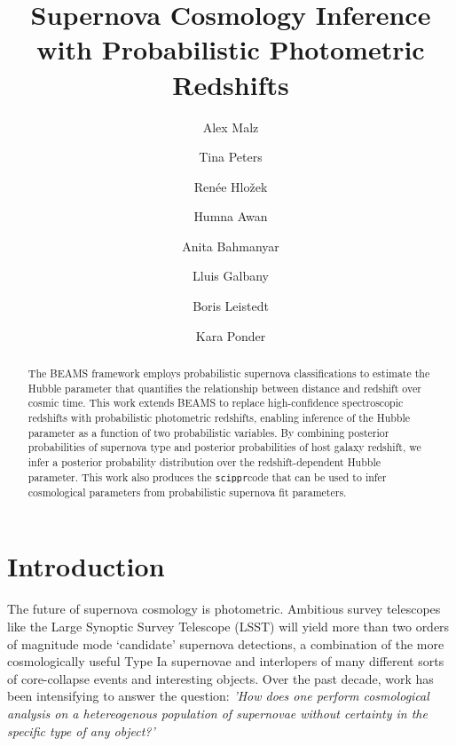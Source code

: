 \documentclass[12pt, onecolumn]{emulateapj}
\newcommand{\scippr}{\texttt{scippr}}
\begin{document}
\newcommand{\tkTP}[1]{\textcolor{red}{#1}}  %
\newcommand{\tkRH}[1]{\textcolor{blue}{#1}}  %
\newcommand{\tkAM}[1]{\textcolor{green}{#1}}  %
\title{Supernova Cosmology Inference with Probabilistic Photometric Redshifts}

\author{Alex Malz}
\author{Tina Peters}
\author{Ren\'ee Hlo\v{z}ek}
\author{Humna Awan}
\author{Anita Bahmanyar}
\author{Lluis Galbany}
\author{Boris Leistedt}
\author{Kara Ponder}

\begin{abstract}
The BEAMS framework employs probabilistic supernova classifications to estimate the Hubble parameter that quantifies the relationship between distance and redshift over cosmic time.  This work extends BEAMS to replace high-confidence spectroscopic redshifts with probabilistic photometric redshifts, enabling inference of the Hubble parameter as a function of two probabilistic variables.  By combining posterior probabilities of supernova type and posterior probabilities of host galaxy redshift, we infer a posterior probability distribution over the redshift-dependent Hubble parameter.  This work also produces the \scippr code that can be used to infer cosmological parameters from probabilistic supernova fit parameters.
\end{abstract}
\keywords{}
\maketitle

\section{Introduction}
\label{sec:intro}
The future of supernova cosmology is photometric. Ambitious survey telescopes like the Large Synoptic Survey Telescope (LSST) will yield more than two orders of magnitude mode `candidate' supernova detections, a combination of the more cosmologically useful Type Ia supernovae and interlopers of many different sorts of core-collapse events and interesting objects. Over the past decade, work has been intensifying to answer the question: \textit{'How does one perform cosmological analysis on a hetereogenous population of supernovae without certainty in the specific type of any object?'} \citet{kunz_bayesian_2007, kelly_flexible_2008, hlozek_photometric_2012, lochner_2012, newling_2012}
\end{document}
